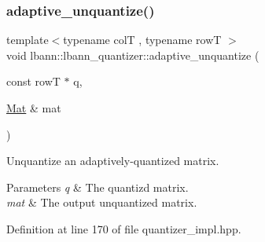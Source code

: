 \subsubsection{\texorpdfstring{adaptive\+\_\+unquantize()}{adaptive\_unquantize()}\hspace{0.1cm}{\footnotesize\ttfamily [1/2]}}
{\footnotesize\ttfamily template$<$typename colT , typename rowT $>$ \\
void lbann\+::lbann\+\_\+quantizer\+::adaptive\+\_\+unquantize (\begin{DoxyParamCaption}\item[{const rowT $\ast$}]{q,  }\item[{\hyperlink{base_8hpp_a68f11fdc31b62516cb310831bbe54d73}{Mat} \&}]{mat }\end{DoxyParamCaption})}

Unquantize an adaptively-\/quantized matrix. 
\begin{DoxyParams}{Parameters}
{\em q} & The quantizd matrix. \\
\hline
{\em mat} & The output unquantized matrix. \\
\hline
\end{DoxyParams}


Definition at line 170 of file quantizer\+\_\+impl.\+hpp.


